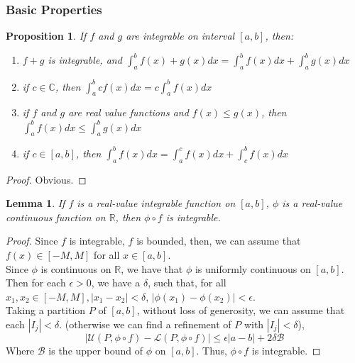 \documentclass[a4paper]{article}
\newtheorem{prop}[theorem]{Proposition}
\newtheorem{lemma}[theorem]{Lemma}
\numberwithin{equation}{subsection}
\begin{document}
\subsubsection{Basic Properties}
\begin{prop}
    \label{prop1}
    If $f$ and $g$ are integrable on interval $[a,b]$, then:
    \begin{enumerate}
        \item $f+g$ is integrable, and $\int_{a}^{b}f(x)+g(x)dx = \int_a^b f(x)dx + \int_a^b g(x)dx$
        \item if $c \in \mathbb{C}$, then $\int_{a}^{b}c f(x)dx = c\int_a^b f(x)dx$
        \item if $f$ and $g$ are real value functions and $f(x)\leq g(x)$, then $\int_a^b f(x)dx \leq \int_a^b g(x)dx$
        \item if $c \in [a, b]$, then $\int_a^b f(x)dx = \int_a^c f(x)dx + \int_c^b f(x)dx$
    \end{enumerate}
\end{prop}
\begin{proof}[Proof]
    Obvious.
\end{proof}

\begin{lemma}
    If $f$ is a real-value integrable function on $[a,b]$, $\phi$ is a real-value continuous function on $\mathbb{R}$, then $\phi \circ f$ is integrable.
\end{lemma}
\begin{proof}[Proof]
    Since $f$ is integrable, $f$ is bounded, then, we can assume that $f(x) \in [-M, M]$ for all $x \in [a, b]$. \\
    Since $\phi$ is continuous on $\mathbb{R}$, we have that $\phi$ is uniformly continuous on $[a,b]$. Then for each $\epsilon>0$, we have a $\delta$, such that, for all $x_1, x_2 \in [-M, M], |x_1 - x_2| < \delta$, $|\phi(x_1) - \phi(x_2)| < \epsilon$. \\
    Taking a partition $P$ of $[a, b]$, without loss of generosity, we can assume that each $|I_j| < \delta$. (otherwise we can find a refinement of $P$ with $|I_j| < \delta$),
    \begin{equation}
        |\mathcal{U}(P, \phi \circ f) - \mathcal{L}(P, \phi \circ f)| \leq \epsilon |a - b| + 2\delta\mathcal{B}
    \end{equation}
    Where $\mathcal{B}$ is the upper bound of $\phi$ on $[a, b]$. Thus, $\phi \circ f$ is integrable.
\end{proof}
\end{document}
